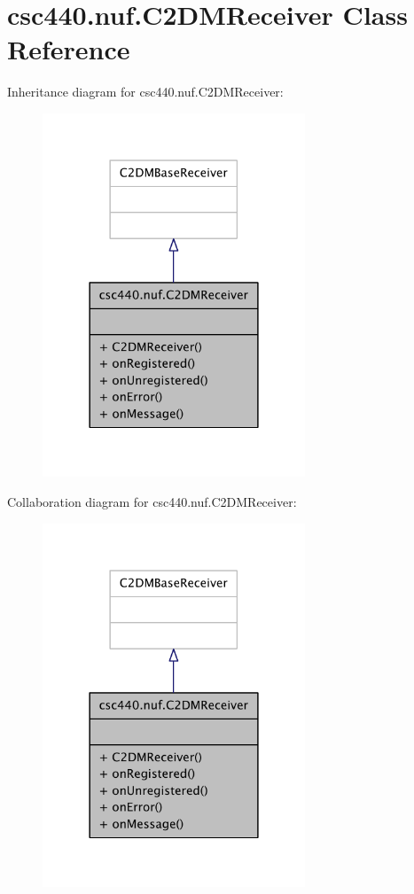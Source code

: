 \hypertarget{classcsc440_1_1nuf_1_1_c2_d_m_receiver}{\section{csc440.\-nuf.\-C2\-D\-M\-Receiver Class Reference}
\label{classcsc440_1_1nuf_1_1_c2_d_m_receiver}
}


Inheritance diagram for csc440.\-nuf.\-C2\-D\-M\-Receiver\-:
\nopagebreak
\begin{figure}[H]
\begin{center}
\leavevmode
\includegraphics[width=222pt]{classcsc440_1_1nuf_1_1_c2_d_m_receiver__inherit__graph}
\end{center}
\end{figure}


Collaboration diagram for csc440.\-nuf.\-C2\-D\-M\-Receiver\-:
\nopagebreak
\begin{figure}[H]
\begin{center}
\leavevmode
\includegraphics[width=222pt]{classcsc440_1_1nuf_1_1_c2_d_m_receiver__coll__graph}
\end{center}
\end{figure}
